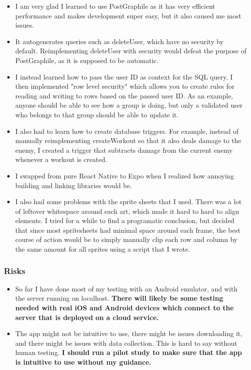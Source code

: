 \documentclass[11pt]{article}
\begin{document}
\begin{itemize}

\item I am very glad I learned to use PostGraphile as it has very efficient performance and makes development super easy, but it also caused me most issues.
\item It autogenerates queries such as deleteUser, which have no security by default. Reimplementing deleteUser with security would defeat the purpose of PostGraphile, as it is supposed to be automatic.
\item I instead learned how to pass the user ID as context for the SQL query. I then implemented "row level security" which allows you to create rules for reading and writing to rows based on the passed user ID. As an example, anyone should be able to see how a group is doing, but only a validated user who belongs to that group should be able to update it. 
\item I also had to learn how to create database triggers. For example, instead of manually reimplementing createWorkout so that it also deals damage to the enemy, I created a trigger that subtracts damage from the current enemy whenever a workout is created.
\item I swapped from pure React Native to Expo when I realized how annoying building and linking libraries would be.
\item I also had some problems with the sprite sheets that I used. There was a lot of leftover whitespace around each art, which made it hard to hard to align elements. I tried for a while to find a programatic conclusion, but decided that since most spritesheets had minimal space around each frame, the best course of action would be to simply manually clip each row and column by the same amount for all sprites using a script that I wrote. 
\end{itemize}

\subsubsection{Risks}\label{risks}

\begin{itemize}
\item So far I have done most of my testing with an Android emulator, and with the server running on localhost. \textbf{There will likely be some testing needed with real iOS and Android devices which connect to the server that is deployed on a cloud service.}
\item The app might not be intuitive to use, there might be issues downloading it, and there might be issues with data collection. This is hard to say without human testing. \textbf{I should run a pilot study to make sure that the app is intuitive to use without my guidance.}
\end{itemize}
\end{document}
